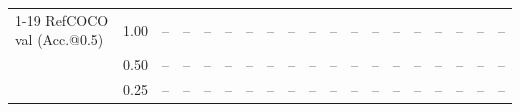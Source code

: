 \begin{table}[t]
{\begin{tabular}{l c | c c c c | c c c c | c c | c c c | c c c c}
\cmidrule(lr){1-19}
RefCOCO val (Acc.@0.5) & 1.00 & -- & -- & -- & -- & -- & -- & -- & -- & -- & -- & -- & -- & -- & -- & -- & -- & -- \\
 & 0.50 & -- & -- & -- & -- & -- & -- & -- & -- & -- & -- & -- & -- & -- & -- & -- & -- & -- \\
 & 0.25 & -- & -- & -- & -- & -- & -- & -- & -- & -- & -- & -- & -- & -- & -- & -- & -- & -- \\
\bottomrule
\end{tabular}}
\end{table}
